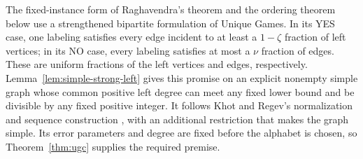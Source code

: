 The fixed-instance form of Raghavendra's theorem and the ordering
theorem below use a strengthened bipartite formulation of Unique Games.
In its YES case, one labeling satisfies every edge incident to at least
a \(1-\zeta\) fraction of left vertices; in its NO case, every labeling
satisfies at most a \(\nu\) fraction of edges. These are uniform
fractions of the left vertices and edges, respectively.
Lemma~\ref{lem:simple-strong-left} gives this promise on an explicit
nonempty simple graph whose common positive left degree can meet any
fixed lower bound and be divisible by any fixed positive integer. It follows
Khot and Regev's normalization and sequence construction
\cite[Lemmas~3.3, 3.4, and~3.6]{KhotRegev2008}, with an additional
restriction that makes the graph simple. Its error parameters and
degree are fixed before the alphabet is chosen, so
Theorem~\ref{thm:ugc} supplies the required premise.

